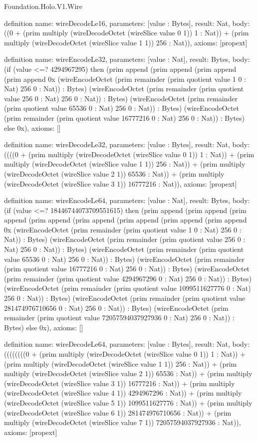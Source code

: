 \begin{lexlean}{Foundation.Holo.V1.Wire}
\begin{semanticmodule}
definition{
  name: wireDecodeLe16,
  parameters: [value : Bytes],
  result: Nat,
  body: ((0 + (prim multiply (wireDecodeOctet (wireSlice value 0 1)) 1 : Nat)) + (prim multiply (wireDecodeOctet (wireSlice value 1 1)) 256 : Nat)),
  axioms: [propext]
}

definition{
  name: wireEncodeLe32,
  parameters: [value : Nat],
  result: Bytes,
  body: (if (value <=? 4294967295) then (prim append (prim append (prim append (prim append 0x (wireEncodeOctet (prim remainder (prim quotient value 1 0 : Nat) 256 0 : Nat)) : Bytes) (wireEncodeOctet (prim remainder (prim quotient value 256 0 : Nat) 256 0 : Nat)) : Bytes) (wireEncodeOctet (prim remainder (prim quotient value 65536 0 : Nat) 256 0 : Nat)) : Bytes) (wireEncodeOctet (prim remainder (prim quotient value 16777216 0 : Nat) 256 0 : Nat)) : Bytes) else 0x),
  axioms: []
}

definition{
  name: wireDecodeLe32,
  parameters: [value : Bytes],
  result: Nat,
  body: ((((0 + (prim multiply (wireDecodeOctet (wireSlice value 0 1)) 1 : Nat)) + (prim multiply (wireDecodeOctet (wireSlice value 1 1)) 256 : Nat)) + (prim multiply (wireDecodeOctet (wireSlice value 2 1)) 65536 : Nat)) + (prim multiply (wireDecodeOctet (wireSlice value 3 1)) 16777216 : Nat)),
  axioms: [propext]
}

definition{
  name: wireEncodeLe64,
  parameters: [value : Nat],
  result: Bytes,
  body: (if (value <=? 18446744073709551615) then (prim append (prim append (prim append (prim append (prim append (prim append (prim append (prim append 0x (wireEncodeOctet (prim remainder (prim quotient value 1 0 : Nat) 256 0 : Nat)) : Bytes) (wireEncodeOctet (prim remainder (prim quotient value 256 0 : Nat) 256 0 : Nat)) : Bytes) (wireEncodeOctet (prim remainder (prim quotient value 65536 0 : Nat) 256 0 : Nat)) : Bytes) (wireEncodeOctet (prim remainder (prim quotient value 16777216 0 : Nat) 256 0 : Nat)) : Bytes) (wireEncodeOctet (prim remainder (prim quotient value 4294967296 0 : Nat) 256 0 : Nat)) : Bytes) (wireEncodeOctet (prim remainder (prim quotient value 1099511627776 0 : Nat) 256 0 : Nat)) : Bytes) (wireEncodeOctet (prim remainder (prim quotient value 281474976710656 0 : Nat) 256 0 : Nat)) : Bytes) (wireEncodeOctet (prim remainder (prim quotient value 72057594037927936 0 : Nat) 256 0 : Nat)) : Bytes) else 0x),
  axioms: []
}

definition{
  name: wireDecodeLe64,
  parameters: [value : Bytes],
  result: Nat,
  body: ((((((((0 + (prim multiply (wireDecodeOctet (wireSlice value 0 1)) 1 : Nat)) + (prim multiply (wireDecodeOctet (wireSlice value 1 1)) 256 : Nat)) + (prim multiply (wireDecodeOctet (wireSlice value 2 1)) 65536 : Nat)) + (prim multiply (wireDecodeOctet (wireSlice value 3 1)) 16777216 : Nat)) + (prim multiply (wireDecodeOctet (wireSlice value 4 1)) 4294967296 : Nat)) + (prim multiply (wireDecodeOctet (wireSlice value 5 1)) 1099511627776 : Nat)) + (prim multiply (wireDecodeOctet (wireSlice value 6 1)) 281474976710656 : Nat)) + (prim multiply (wireDecodeOctet (wireSlice value 7 1)) 72057594037927936 : Nat)),
  axioms: [propext]
}


\end{semanticmodule}
\end{lexlean}
